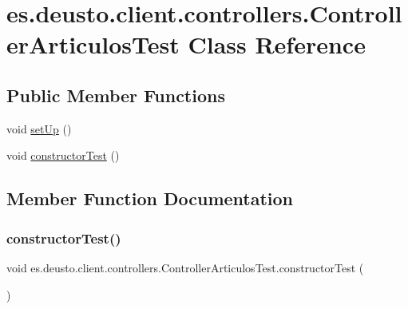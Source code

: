 \hypertarget{classes_1_1deusto_1_1client_1_1controllers_1_1_controller_articulos_test}{}\section{es.\+deusto.\+client.\+controllers.\+Controller\+Articulos\+Test Class Reference}
\label{classes_1_1deusto_1_1client_1_1controllers_1_1_controller_articulos_test}
\subsection*{Public Member Functions}
\begin{DoxyCompactItemize}
\item 
void \mbox{\hyperlink{classes_1_1deusto_1_1client_1_1controllers_1_1_controller_articulos_test_a30b75221cdd4db918a5fc87bb3b7ac5d}{set\+Up}} ()
\item 
void \mbox{\hyperlink{classes_1_1deusto_1_1client_1_1controllers_1_1_controller_articulos_test_a2ce9c3cf93135f8ec414f669735bae34}{constructor\+Test}} ()
\end{DoxyCompactItemize}


\subsection{Member Function Documentation}
\mbox{\label{classes_1_1deusto_1_1client_1_1controllers_1_1_controller_articulos_test_a2ce9c3cf93135f8ec414f669735bae34}} 
\subsubsection{\texorpdfstring{constructorTest()}{constructorTest()}}
{\footnotesize\ttfamily void es.\+deusto.\+client.\+controllers.\+Controller\+Articulos\+Test.\+constructor\+Test (\begin{DoxyParamCaption}{ }\end{DoxyParamCaption})}

\mbox{\label{classes_1_1deusto_1_1client_1_1controllers_1_1_controller_articulos_test_a30b75221cdd4db918a5fc87bb3b7ac5d}} 
